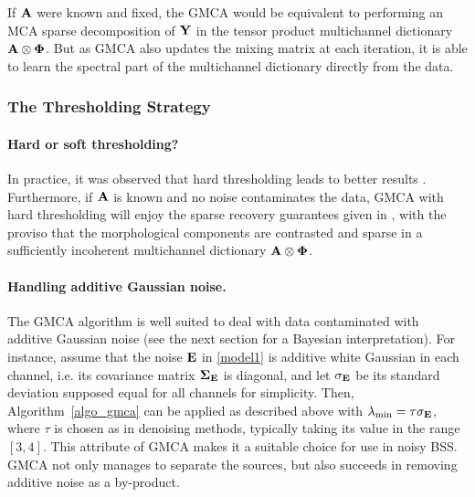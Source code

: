 If ${\mathbf{A}}$ were known and fixed, the GMCA would be equivalent to performing an MCA sparse decomposition of $\mathbf{Y}$ in the tensor product 
multichannel dictionary ${{\mathbf{A}}} \otimes {\bf\Phi}$. But as GMCA also updates the mixing matrix at each iteration, it is able to learn the 
spectral part of the multichannel dictionary directly from the data.

\subsubsection{The Thresholding Strategy}


\paragraph*{Hard or soft thresholding?} In practice, it was observed that hard thresholding leads to better results \citep{starck:bobin06,starck:bobin07}. 
Furthermore, if ${\mathbf{A}}$ is known and no noise contaminates the data, GMCA with hard thresholding will enjoy the sparse recovery guarantees given in \citep{starck:bobin_2,BobinJMIV}, 
with the proviso that the morphological components are contrasted and sparse in a sufficiently incoherent multichannel dictionary ${{\mathbf{A}}} \otimes {\bf\Phi}$. 

\paragraph*{Handling additive Gaussian noise.}
The GMCA algorithm is well suited to deal with data contaminated with additive Gaussian noise (see the next section for a Bayesian interpretation). 
For instance, assume that the noise $\bf E$ in \eqref{model1} is additive white Gaussian in each channel, i.e. its covariance matrix 
${\boldsymbol \Sigma}_{\bf E}$ is diagonal, and let $\sigma_{\bf E}$ be its standard deviation supposed equal for all channels for simplicity. 
Then, Algorithm~\ref{algo_gmca} can be applied as described above with $\lambda_{\min}=\tau\sigma_{\bf E}$, where $\tau$ is chosen as in denoising methods, 
typically taking its value in the range $[3,4]$. This attribute of GMCA makes it a suitable choice for use in noisy BSS. 
GMCA not only manages to separate the sources, but also succeeds in removing additive noise as a by-product.

